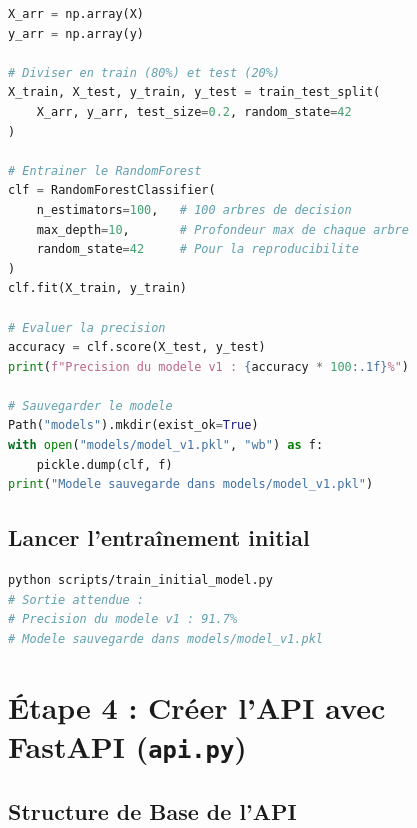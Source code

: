 \documentclass[a4paper,11pt]{article}
\begin{document}
\begin{lstlisting}[language=Python, caption=scripts/train\_initial\_model.py]
X_arr = np.array(X)
y_arr = np.array(y)

# Diviser en train (80%) et test (20%)
X_train, X_test, y_train, y_test = train_test_split(
    X_arr, y_arr, test_size=0.2, random_state=42
)

# Entrainer le RandomForest
clf = RandomForestClassifier(
    n_estimators=100,   # 100 arbres de decision
    max_depth=10,       # Profondeur max de chaque arbre
    random_state=42     # Pour la reproducibilite
)
clf.fit(X_train, y_train)

# Evaluer la precision
accuracy = clf.score(X_test, y_test)
print(f"Precision du modele v1 : {accuracy * 100:.1f}%")

# Sauvegarder le modele
Path("models").mkdir(exist_ok=True)
with open("models/model_v1.pkl", "wb") as f:
    pickle.dump(clf, f)
print("Modele sauvegarde dans models/model_v1.pkl")
\end{lstlisting}

\subsection{Lancer l'entraînement initial}
\begin{lstlisting}[language=bash]
python scripts/train_initial_model.py
# Sortie attendue :
# Precision du modele v1 : 91.7%
# Modele sauvegarde dans models/model_v1.pkl
\end{lstlisting}


\section{Étape 4 : Créer l'API avec FastAPI (\texttt{api.py})}

\subsection{Structure de Base de l'API}
\end{document}
